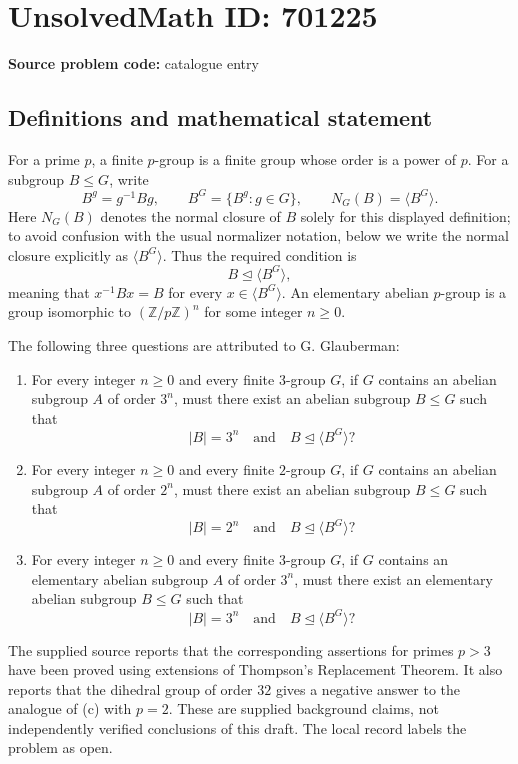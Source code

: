 \documentclass[11pt]{article}
\newcommand{\Z}{\mathbb{Z}}
\begin{document}
\section*{UnsolvedMath ID: 701225}
\textbf{Source problem code:} catalogue entry
\subsection{Definitions and mathematical statement}
For a prime \(p\), a finite \(p\)-group is a finite group whose order is a power of \(p\). For a subgroup \(B\leq G\), write
\[
B^g=g^{-1}Bg,\qquad B^G=\{B^g:g\in G\},\qquad N_G(B)=\langle B^G\rangle.
\]
Here \(N_G(B)\) denotes the normal closure of \(B\) solely for this displayed definition; to avoid confusion with the usual normalizer notation, below we write the normal closure explicitly as \(\langle B^G\rangle\). Thus the required condition is
\[
B\trianglelefteq\langle B^G\rangle,
\]
meaning that \(x^{-1}Bx=B\) for every \(x\in\langle B^G\rangle\). An elementary abelian \(p\)-group is a group isomorphic to \((\Z/p\Z)^n\) for some integer \(n\geq0\).

The following three questions are attributed to G. Glauberman:
\begin{enumerate}
\item[(a)] For every integer \(n\geq0\) and every finite \(3\)-group \(G\), if \(G\) contains an abelian subgroup \(A\) of order \(3^n\), must there exist an abelian subgroup \(B\leq G\) such that
\[
|B|=3^n\quad\text{and}\quad B\trianglelefteq\langle B^G\rangle?
\]
\item[(b)] For every integer \(n\geq0\) and every finite \(2\)-group \(G\), if \(G\) contains an abelian subgroup \(A\) of order \(2^n\), must there exist an abelian subgroup \(B\leq G\) such that
\[
|B|=2^n\quad\text{and}\quad B\trianglelefteq\langle B^G\rangle?
\]
\item[(c)] For every integer \(n\geq0\) and every finite \(3\)-group \(G\), if \(G\) contains an elementary abelian subgroup \(A\) of order \(3^n\), must there exist an elementary abelian subgroup \(B\leq G\) such that
\[
|B|=3^n\quad\text{and}\quad B\trianglelefteq\langle B^G\rangle?
\]
\end{enumerate}
The supplied source reports that the corresponding assertions for primes \(p>3\) have been proved using extensions of Thompson's Replacement Theorem. It also reports that the dihedral group of order \(32\) gives a negative answer to the analogue of (c) with \(p=2\). These are supplied background claims, not independently verified conclusions of this draft. The local record labels the problem as open.
\end{document}
